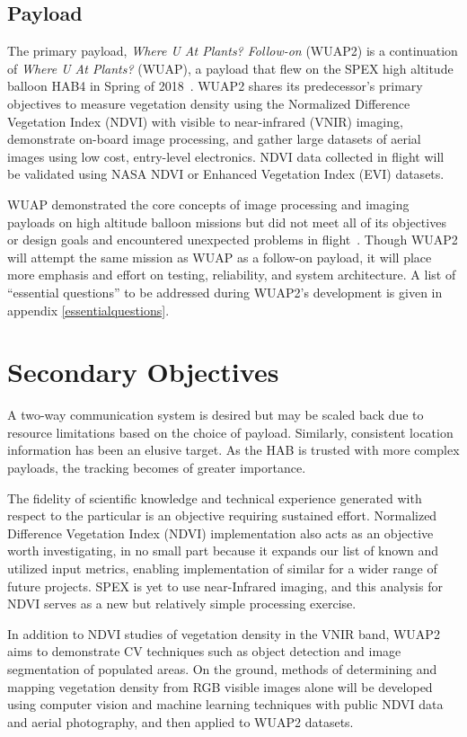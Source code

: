 \documentclass[conference]{IEEEtran} %
\begin{document}
\subsection{Payload}
\label{payloadobjectives}
The primary payload, \textit{Where U At Plants? Follow-on} (WUAP2) is a continuation of \textit{Where U At Plants?} (WUAP), a payload that flew on the SPEX high altitude balloon  HAB4 in Spring of 2018~\cite{wuaphab4}. 
WUAP2 shares its predecessor's primary objectives to measure vegetation density using the Normalized Difference Vegetation Index (NDVI) with visible to near-infrared (VNIR) imaging, demonstrate on-board image processing, and gather large datasets of aerial images using low cost, entry-level electronics. 
NDVI data collected in flight will be validated using NASA NDVI or Enhanced Vegetation Index (EVI) datasets.

WUAP demonstrated the core concepts of image processing and imaging payloads on high altitude balloon missions but did not meet all of its objectives or design goals and encountered unexpected problems in flight~\cite[Post-Flight Analysis]{wuaphab4}. 
Though WUAP2 will attempt the same mission as WUAP as a follow-on payload, it will place more emphasis and effort on testing, reliability, and system architecture. A list of ``essential questions'' to be addressed during WUAP2's development is given in appendix \ref{essentialquestions}.


\section{Secondary Objectives}
\label{secondaryobjectives}
A two-way communication system is desired but may be scaled back due to resource limitations based on the choice of payload. 
Similarly, consistent location information has been an elusive target. 
As the HAB is trusted with more complex payloads, the tracking becomes of greater importance.

The fidelity of scientific knowledge and technical experience generated with respect to the particular is an objective requiring sustained effort.
Normalized Difference Vegetation Index (NDVI) implementation also acts as an objective worth investigating, in no small part because it expands our list of known and utilized input metrics, enabling implementation of similar for a wider range of future projects. 
SPEX is yet to use near-Infrared imaging, and this analysis for NDVI serves as a new but relatively simple processing exercise.
 
In addition to NDVI studies of vegetation density in the VNIR band, WUAP2 aims to demonstrate CV techniques such as object detection and image segmentation of populated areas. 
On the ground, methods of determining and mapping vegetation density from RGB visible images alone will be developed using computer vision and machine learning techniques with public NDVI data and aerial photography, and then applied to WUAP2 datasets. 
\end{document}
